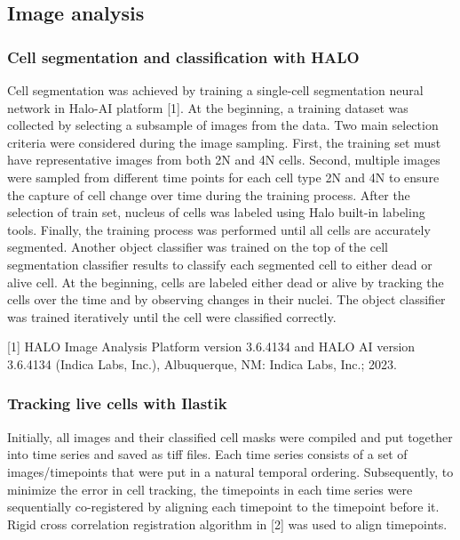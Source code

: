 \documentclass[11pt,notitlepage]{article}
\begin{document}
\subsection*{Image analysis}
 \subsubsection*{Cell segmentation and classification with HALO}

Cell segmentation was achieved by training a single-cell segmentation neural network in Halo-AI platform [1]. At the beginning, a training dataset was collected by selecting a subsample of images from the data. Two main selection criteria were considered during the image sampling. First, the training set must have representative images from both 2N and 4N cells. Second, multiple images were sampled from different time points for each cell type 2N and 4N to ensure the capture of cell change over time during the training process. After the selection of train set, nucleus of cells was labeled using Halo built-in labeling tools. Finally, the training process was performed until all cells are accurately segmented. 
Another object classifier was trained on the top of the cell segmentation classifier results to classify each segmented cell to either dead or alive cell. At the beginning, cells are labeled either dead or alive by tracking the cells over the time and by observing changes in their nuclei. The object classifier was trained iteratively until the cell were classified correctly.

[1] HALO Image Analysis Platform version 3.6.4134 and HALO AI version 3.6.4134 (Indica Labs, Inc.), Albuquerque, NM: Indica Labs, Inc.; 2023.

\subsubsection*{Tracking live cells with Ilastik}

Initially, all images and their classified cell masks were compiled and put together into time series and saved as tiff files. Each time series consists of a set of images/timepoints that were put in a natural temporal ordering. Subsequently, to minimize the error in cell tracking, the timepoints in each time series were sequentially co-registered by aligning each timepoint to the timepoint before it. Rigid cross correlation registration algorithm in [2] was used to align timepoints.
\end{document}
